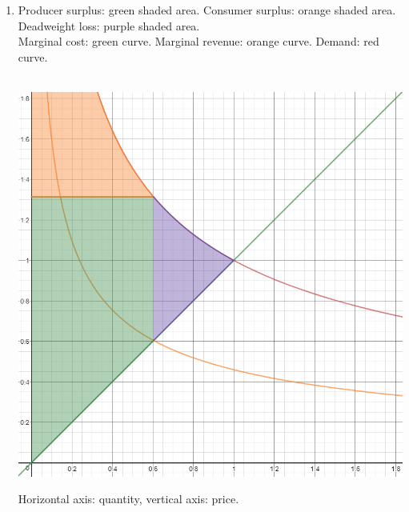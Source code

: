 \documentclass{article}
\begin{document}
\begin{enumerate}
    \item Producer surplus: green shaded area. Consumer surplus: orange shaded
        area. Deadweight loss: purple shaded area.\\
        Marginal cost: green curve. Marginal revenue: orange curve. Demand: red
        curve.\\\\
        \begin{center}\includegraphics[scale=0.75]{Capture}\end{center}
        Horizontal axis: quantity, vertical axis: price.
    
\end{enumerate}
        
\end{document}
